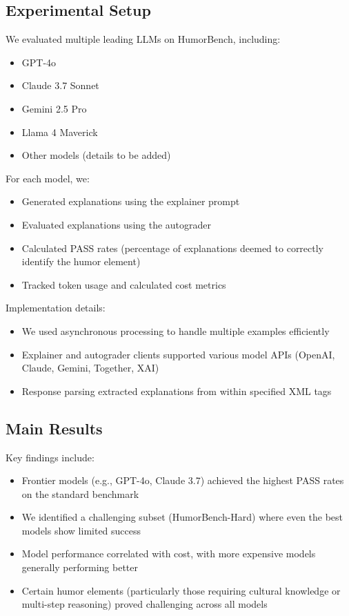 \documentclass[twocolumn]{article}
\begin{document}
\subsection{Experimental Setup}

We evaluated multiple leading LLMs on HumorBench, including:
\begin{itemize}
    \item GPT-4o
    \item Claude 3.7 Sonnet
    \item Gemini 2.5 Pro
    \item Llama 4 Maverick
    \item Other models (details to be added)
\end{itemize}

For each model, we:
\begin{itemize}
    \item Generated explanations using the explainer prompt
    \item Evaluated explanations using the autograder
    \item Calculated PASS rates (percentage of explanations deemed to correctly identify the humor element)
    \item Tracked token usage and calculated cost metrics
\end{itemize}

Implementation details:
\begin{itemize}
    \item We used asynchronous processing to handle multiple examples efficiently
    \item Explainer and autograder clients supported various model APIs (OpenAI, Claude, Gemini, Together, XAI)
    \item Response parsing extracted explanations from within specified XML tags
\end{itemize}


\subsection{Main Results}


Key findings include:
\begin{itemize}
    \item Frontier models (e.g., GPT-4o, Claude 3.7) achieved the highest PASS rates on the standard benchmark
    \item We identified a challenging subset (HumorBench-Hard) where even the best models show limited success
    \item Model performance correlated with cost, with more expensive models generally performing better
    \item Certain humor elements (particularly those requiring cultural knowledge or multi-step reasoning) proved challenging across all models
\end{itemize}
\end{document}
